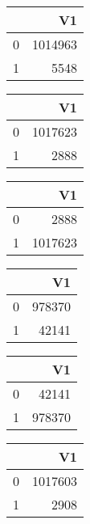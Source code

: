 \bigskip\bigskip
\centering
\begin{tabular}{rr}
  \hline
 & V1 \\ 
  \hline
0 & 1014963 \\ 
  1 & 5548 \\ 
   \hline
\end{tabular}

\bigskip\bigskip
\centering
\begin{tabular}{rr}
  \hline
 & V1 \\ 
  \hline
0 & 1017623 \\ 
  1 & 2888 \\ 
   \hline
\end{tabular}

\bigskip\bigskip
\centering
\begin{tabular}{rr}
  \hline
 & V1 \\ 
  \hline
0 & 2888 \\ 
  1 & 1017623 \\ 
   \hline
\end{tabular}

\bigskip\bigskip
\centering
\begin{tabular}{rr}
  \hline
 & V1 \\ 
  \hline
0 & 978370 \\ 
  1 & 42141 \\ 
   \hline
\end{tabular}

\bigskip\bigskip
\centering
\begin{tabular}{rr}
  \hline
 & V1 \\ 
  \hline
0 & 42141 \\ 
  1 & 978370 \\ 
   \hline
\end{tabular}

\bigskip\bigskip
\centering
\begin{tabular}{rr}
  \hline
 & V1 \\ 
  \hline
0 & 1017603 \\ 
  1 & 2908 \\ 
   \hline
\end{tabular}


